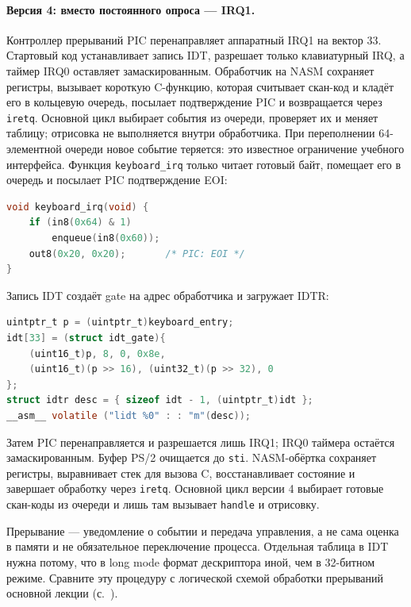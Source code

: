 \paragraph{Версия 4: вместо постоянного опроса --- IRQ1.}
Контроллер прерываний PIC перенаправляет аппаратный IRQ1 на вектор 33.
Стартовый код устанавливает запись IDT, разрешает только клавиатурный
IRQ, а таймер IRQ0 оставляет замаскированным. Обработчик на NASM
сохраняет регистры, вызывает короткую C-функцию, которая считывает
скан-код и кладёт его в кольцевую очередь, посылает подтверждение PIC
и возвращается через \texttt{iretq}. Основной цикл выбирает события
из очереди, проверяет их и меняет таблицу; отрисовка не выполняется
внутри обработчика. При переполнении 64-элементной очереди новое событие
теряется: это известное ограничение учебного интерфейса.
Функция \texttt{keyboard\_irq} только читает готовый байт,
помещает его в очередь и посылает PIC подтверждение EOI:
\begin{lstlisting}[language=C,basicstyle=\ttfamily\small]
void keyboard_irq(void) {
    if (in8(0x64) & 1)
        enqueue(in8(0x60));
    out8(0x20, 0x20);       /* PIC: EOI */
}
\end{lstlisting}
Запись IDT создаёт gate на адрес обработчика и загружает IDTR:
\begin{lstlisting}[language=C,basicstyle=\ttfamily\small]
uintptr_t p = (uintptr_t)keyboard_entry;
idt[33] = (struct idt_gate){
    (uint16_t)p, 8, 0, 0x8e,
    (uint16_t)(p >> 16), (uint32_t)(p >> 32), 0
};
struct idtr desc = { sizeof idt - 1, (uintptr_t)idt };
__asm__ volatile ("lidt %0" : : "m"(desc));
\end{lstlisting}
Затем PIC перенаправляется и разрешается лишь IRQ1; IRQ0 таймера остаётся
замаскированным. Буфер PS/2 очищается до \texttt{sti}. NASM-обёртка
сохраняет регистры, выравнивает стек для вызова C, восстанавливает состояние
и завершает обработку через \texttt{iretq}. Основной цикл версии 4 выбирает
готовые скан-коды из очереди и лишь там вызывает \texttt{handle} и отрисовку.

Прерывание --- уведомление о событии и передача управления, а не
сама оценка в памяти и не обязательное переключение процесса.
Отдельная таблица в IDT нужна потому, что в long mode формат дескриптора
иной, чем в 32-битном режиме. Сравните эту процедуру с логической схемой
обработки прерываний основной лекции (с.~\pageref{lecture04-interrupts}).

